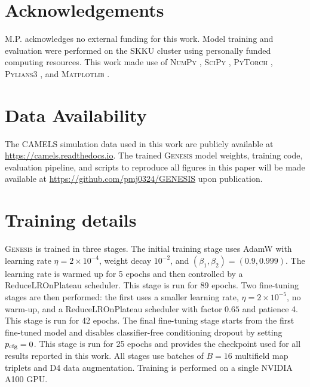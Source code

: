 \documentclass[usenatbib]{mnras}
\begin{document}
\section*{Acknowledgements}

M.P. acknowledges no external funding for this work.
Model training and evaluation were performed on the SKKU cluster using
personally funded computing resources.
This work made use of
\textsc{NumPy} \citep{Harris2020},
\textsc{SciPy} \citep{Virtanen2020},
\textsc{PyTorch} \citep{Paszke2019},
\textsc{Pylians3} \citep{Villaescusa2018Pylians},
and \textsc{Matplotlib} \citep{Hunter2007}.

\section*{Data Availability}

The CAMELS simulation data used in this work are publicly available at
\url{https://camels.readthedocs.io}.
The trained \textsc{Genesis} model weights, training code, evaluation
pipeline, and scripts to reproduce all figures in this paper will be
made available at \url{https://github.com/pmj0324/GENESIS} upon
publication.




\appendix

\section{Training details}
\label{app:training_details}

\textsc{Genesis} is trained in three stages. The initial training stage
uses AdamW \citep{Loshchilov2019} with learning rate
$\eta=2\times10^{-4}$, weight decay $10^{-2}$, and
$(\beta_1,\beta_2)=(0.9,0.999)$. The learning rate is warmed up for
5 epochs and then controlled by a ReduceLROnPlateau scheduler. This
stage is run for 89 epochs. Two fine-tuning stages are then performed:
the first uses a smaller learning rate, $\eta=2\times10^{-5}$, no
warm-up, and a ReduceLROnPlateau scheduler with factor $0.65$ and
patience 4. This stage is run for 42 epochs. The final fine-tuning
stage starts from the first fine-tuned model and disables
classifier-free conditioning dropout by setting $p_{\rm cfg}=0$. This
stage is run for 25 epochs and provides the checkpoint used for all
results reported in this work. All stages use batches of $B=16$
multifield map triplets and D4 data augmentation. Training is performed
on a single NVIDIA A100 GPU.
\end{document}

